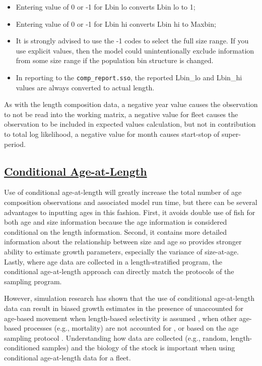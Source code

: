 \begin{itemize}
	\item Entering value of 0 or -1 for Lbin lo converts Lbin lo to 1;
	\item Entering value of 0 or -1 for Lbin hi converts Lbin hi to Maxbin;
	\item It is strongly advised to use the -1 codes to select the full size range. If you use explicit values, then the model could unintentionally exclude information from some size range if the population bin structure is changed.
	\item In reporting to the \texttt{comp\_report.sso}, the reported Lbin\_lo and Lbin\_hi values are always converted to actual length.
\end{itemize}

As with the length composition data, a negative year value causes the observation to not be read into the working matrix, a negative value for fleet causes the observation to be included in expected values calculation, but not in contribution to total log likelihood, a negative value for month causes start-stop of super-period.

\hypertarget{CondAatL}{}
\subsection[Conditional Age-at-Length]{\protect\hyperlink{CondAatL}{Conditional Age-at-Length}}
Use of conditional age-at-length will greatly increase the total number of age composition observations and associated model run time, but there can be several advantages to inputting ages in this fashion. First, it avoids double use of fish for both age and size information because the age information is considered conditional on the length information. Second, it contains more detailed information about the relationship between size and age so provides stronger ability to estimate growth parameters, especially the variance of size-at-age. Lastly, where age data are collected in a length-stratified program, the conditional age-at-length approach can directly match the protocols of the sampling program.

However, simulation research has shown that the use of conditional age-at-length data can result in biased growth estimates in the presence of unaccounted for age-based movement when length-based selectivity is assumed \citep{lee-effects-2017}, when other age-based processes (e.g., mortality) are not accounted for \citep{lee-use-2019}, or based on the age sampling protocol \citep{piner-evaluation-2016}. Understanding how data are collected (e.g., random, length-conditioned samples) and the biology of the stock is important when using conditional age-at-length data for a fleet.     

